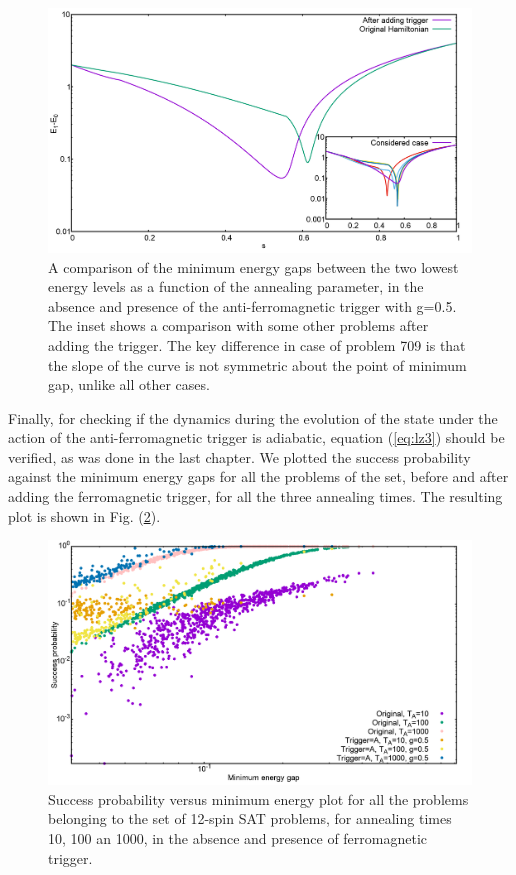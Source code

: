 \documentclass[../main.tex]{subfiles}
\begin{document}
\begin{figure}[H]
\centering 
\includegraphics[scale=0.24]{Mingap_709_g0_A.png}
\caption{A comparison of the minimum energy gaps between the two lowest energy levels as a function of the annealing parameter, in the absence and presence of the anti-ferromagnetic trigger with g=0.5. The inset shows a comparison with some other problems after adding the trigger. The key difference in case of problem 709 is that the slope of the curve is not symmetric about the point of minimum gap, unlike all other cases. }
\label{fig:a15}
\end{figure}

Finally, for checking if the dynamics during the evolution of the state under the action of the anti-ferromagnetic trigger is adiabatic, equation (\ref{eq:lz3}) should be verified, as was done in the last chapter. We plotted the success probability against the minimum energy gaps for all the problems of the set, before and after adding the ferromagnetic trigger, for all the three annealing times. The resulting plot is shown in Fig. (\ref{fig:a17}).

\begin{figure}[H]
\centering 
\includegraphics[scale=0.24]{SuccVsGap_OA_g0.png}
\caption{Success probability versus minimum energy plot for all the problems belonging to the set of 12-spin SAT problems, for annealing times 10, 100 an 1000, in the absence and presence of ferromagnetic trigger.}
\label{fig:a17}
\end{figure}
\end{document}
